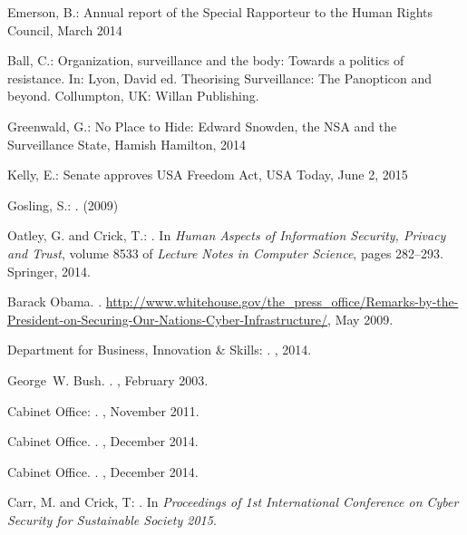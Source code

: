 \documentclass{llncs}
\begin{document}
%
%
\begin{thebibliography}{}
%
Emerson, B.:
Annual report of the Special Rapporteur to the Human Rights Council, March 2014

Ball, C.:
Organization, surveillance and the body: Towards a politics of resistance. In: Lyon, David ed. Theorising Surveillance: The Panopticon and beyond. Collumpton, UK: Willan Publishing. 

Greenwald, G.:
No Place to Hide: Edward Snowden, the NSA and the Surveillance State, Hamish Hamilton, 2014

Kelly, E.:
Senate approves USA Freedom Act, {USA Today},  June 2, 2015

Gosling, S.:
.
 (2009)

Oatley, G. and Crick, T.:
.
\newblock In {\em {Human Aspects of Information Security, Privacy and Trust}},
  volume 8533 of {\em {Lecture Notes in Computer Science}}, pages 282--293.
  Springer, 2014.

Barack Obama.
.
\newblock
  \url{http://www.whitehouse.gov/the_press_office/Remarks-by-the-President-on-Securing-Our-Nations-Cyber-Infrastructure/},
  May 2009.

{Department for Business, Innovation \& Skills}:
.
, 2014.

George~W. Bush.
.
, February 2003.

{Cabinet Office}:
.
, November 2011.

{Cabinet Office}.
.
, December 2014.

{Cabinet Office}.
.
, December 2014.

Carr, M. and Crick, T:
.
\newblock In {\em {Proceedings of 1st International Conference on Cyber
  Security for Sustainable Society 2015}}.


\end{thebibliography}
\end{document}
